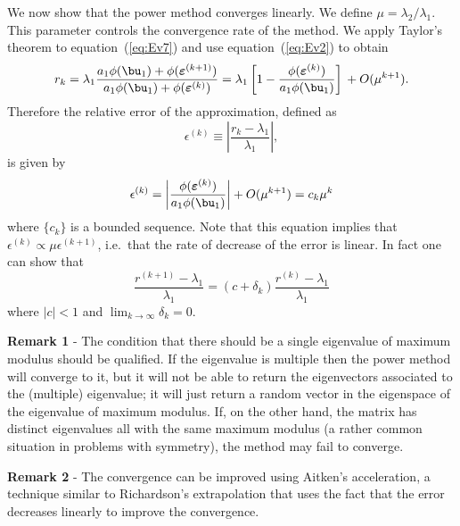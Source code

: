 We now show that the power method converges linearly.  We define $\mu
= {\lambda_2}/{\lambda_1}$.  This parameter controls the convergence
rate of the method.  We apply Taylor's theorem to
equation~(\ref{eq:Ev7}) and use equation~(\ref{eq:Ev2}) to obtain
%
\begin{equation*}
 r_k = \lambda_1
        \frac{a_1 \phi(\bu_1) + \phi(\boldsymbol{\varepsilon}^{(k+1)})}
             {a_1 \phi(\bu_1) + \phi(\boldsymbol{\varepsilon}^{(k)})}
     = \lambda_1
        \left [ 1 - \frac{\phi (\boldsymbol{\varepsilon}^{(k)} )}{a_1 \phi(\bu_1)}\right ] \,
        + O(\mu^{k+1}) .
\end{equation*}
%
Therefore the relative error of the approximation, defined as
%
\begin{equation}
  \epsilon^{(k)} \equiv \left |
    \frac{r_k - \lambda_1}{\lambda_1} \right | ,
  \label{eq:Ev4}
\end{equation}
%
is given by
%
\begin{equation}
  \epsilon^{(k)} =
  \left | \frac{\phi (\boldsymbol{\varepsilon}^{(k)} )}{a_1 \phi(\bu_1)} \right|  + O(\mu^{k+1}) =  c_k \mu^k
  \label{eq:Ev9}
\end{equation}
%
where $\{c_k\}$ is a bounded sequence.  Note that this equation
implies that $\epsilon^{(k)} \propto \mu \epsilon^{(k+1)}$, i.e.\ that
the rate of decrease of the error is linear.  In fact one can show
that
%
\begin{equation*}
  \frac{r^{(k+1)} - \lambda_1}{\lambda_1} = (c + \delta_k)
  \frac{r^{(k)} - \lambda_1}{\lambda_1}
\end{equation*}
%
where $|c| < 1$ and $\lim_{k \to \infty} \delta_k = 0$.

\smallskip

\smallskip

\noindent \textbf{Remark 1} - The condition that there should be a
single eigenvalue of maximum modulus should be qualified.  If the
eigenvalue is multiple then the power method will converge to it, but
it will not be able to return the eigenvectors associated to the
(multiple) eigenvalue; it will just return a random vector in the
eigenspace of the eigenvalue of maximum modulus.  If, on the other
hand, the matrix has distinct eigenvalues all with the same maximum
modulus (a rather common situation in problems with symmetry), the
method may fail to converge.

\smallskip

\noindent \textbf{Remark 2} - The convergence can be improved using
Aitken's acceleration, a technique similar to Richardson's
extrapolation  that uses the fact that the error decreases linearly to
improve the convergence.

